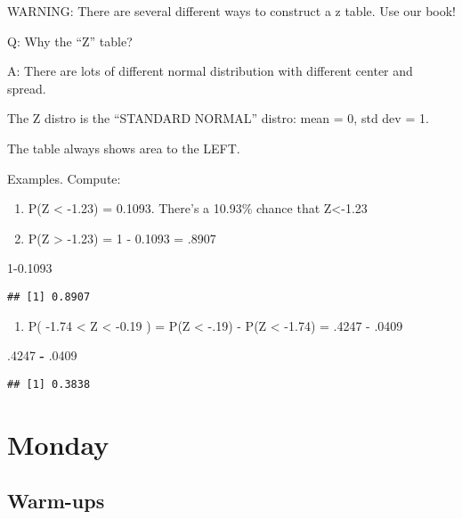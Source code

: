 \documentclass[]{article}
\newenvironment{Shaded}{\begin{snugshade}}{\end{snugshade}}
\newcommand{\DecValTok}[1]{\textcolor[rgb]{0.00,0.00,0.81}{#1}}
\newcommand{\FloatTok}[1]{\textcolor[rgb]{0.00,0.00,0.81}{#1}}
\newcommand{\OperatorTok}[1]{\textcolor[rgb]{0.81,0.36,0.00}{\textbf{#1}}}
\newcommand{\StringTok}[1]{\textcolor[rgb]{0.31,0.60,0.02}{#1}}
\providecommand{\tightlist}{%
  \setlength{\itemsep}{0pt}\setlength{\parskip}{0pt}}
\begin{document}
WARNING: There are several different ways to construct a z table. Use
our book!

Q: Why the ``Z'' table?

A: There are lots of different normal distribution with different center
and spread.

The Z distro is the ``STANDARD NORMAL'' distro: mean = 0, std dev = 1.

The table always shows area to the LEFT.

Examples. Compute:

\begin{enumerate}
\def\labelenumi{\arabic{enumi})}
\item
  P(Z \textless{} -1.23) = 0.1093. There's a 10.93\% chance that
  Z\textless{}-1.23
\item
  P(Z \textgreater{} -1.23) = 1 - 0.1093 = .8907
\end{enumerate}

\begin{Shaded}
\begin{Highlighting}[]
\DecValTok{1}\FloatTok{-0.1093}
\end{Highlighting}
\end{Shaded}

\begin{verbatim}
## [1] 0.8907
\end{verbatim}

\begin{enumerate}
\def\labelenumi{\arabic{enumi})}
\setcounter{enumi}{2}
\tightlist
\item
  P( -1.74 \textless{} Z \textless{} -0.19 ) = P(Z \textless{} -.19) -
  P(Z \textless{} -1.74) = .4247 - .0409
\end{enumerate}

\begin{Shaded}
\begin{Highlighting}[]
\FloatTok{.4247} \OperatorTok{-}\StringTok{ }\FloatTok{.0409}
\end{Highlighting}
\end{Shaded}

\begin{verbatim}
## [1] 0.3838
\end{verbatim}

\hypertarget{monday}{%
\section{Monday}\label{monday}}

\hypertarget{warm-ups}{%
\subsection{Warm-ups}\label{warm-ups}}
\end{document}
